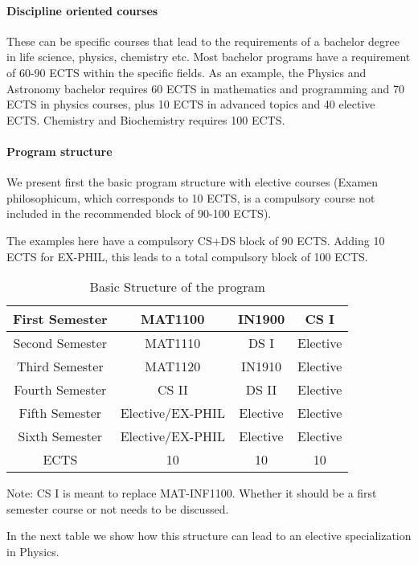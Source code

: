 \documentclass[oneside,final,10pt]{article}
\begin{document}
\paragraph{Discipline oriented courses}

These can be specific courses that lead to the requirements of a bachelor degree in life science, physics, chemistry etc. Most bachelor programs have a requirement of 60-90 ECTS within the specific fields. As an example, the Physics and Astronomy bachelor requires 60 ECTS in mathematics and programming and 70 ECTS in physics courses, plus 10 ECTS in advanced topics and 40 elective ECTS.  
Chemistry and Biochemistry requires 100 ECTS. 


\paragraph{Program structure}
We present first the basic program structure with elective courses (Examen philosophicum, which corresponds to 10 ECTS, is a compulsory course not included in the recommended block of 90-100 ECTS).

The examples here have a compulsory CS+DS block of 90 ECTS. Adding 10 ECTS for EX-PHIL, this leads to a total compulsory block of 100 ECTS. 

\begin{table}[]
    \centering
    \begin{tabular}{|c|c|c|c|} \hline
    First Semester & MAT1100 &  IN1900   & CS I  \\ \hline 
    Second Semester & MAT1110 &  DS I   & Elective \\ \hline
    Third Semester & MAT1120 &  IN1910   &  Elective\\ \hline
    Fourth Semester & CS II & DS II    & Elective \\ \hline       
    Fifth Semester & Elective/EX-PHIL & Elective     & Elective \\ \hline
    Sixth Semester & Elective/EX-PHIL & Elective    & Elective \\ \hline
   ECTS & 10 &  10   &  10  \\ \hline    
    \end{tabular}
    \caption{Basic Structure of the program}
\end{table}

Note: CS I is meant to replace MAT-INF1100. Whether it should be a first semester course or not needs to be discussed. 


In the next table we show how this structure can lead to an elective specialization in Physics.
\end{document}
